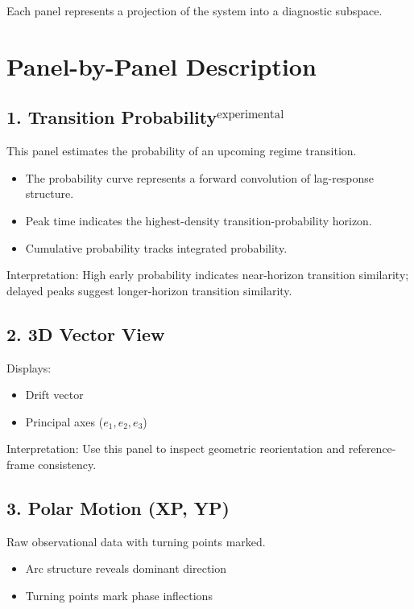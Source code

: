 \documentclass[11pt]{article}
\begin{document}
Each panel represents a projection of the system into a diagnostic subspace.

\section{Panel-by-Panel Description}

\subsection{1. Transition Probability$^{\mathrm{experimental}}$}

This panel estimates the probability of an upcoming regime transition.

\begin{itemize}
\item The probability curve represents a forward convolution of lag-response structure.
\item Peak time indicates the highest-density transition-probability horizon.
\item Cumulative probability tracks integrated probability.
\end{itemize}

Interpretation:
High early probability indicates near-horizon transition similarity; delayed peaks suggest longer-horizon transition similarity.

\subsection{2. 3D Vector View}

Displays:

\begin{itemize}
\item Drift vector
\item Principal axes ($e_1, e_2, e_3$)
\end{itemize}

Interpretation:
Use this panel to inspect geometric reorientation and reference-frame consistency.

\subsection{3. Polar Motion (XP, YP)}

Raw observational data with turning points marked.

\begin{itemize}
\item Arc structure reveals dominant direction
\item Turning points mark phase inflections
\end{itemize}
\end{document}

